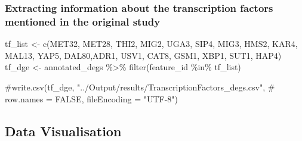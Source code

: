 \documentclass[
  letterpaper,
  DIV=11,
  numbers=noendperiod]{scrartcl}
\newenvironment{Shaded}{\begin{snugshade}}{\end{snugshade}}
\newcommand{\CommentTok}[1]{\textcolor[rgb]{0.37,0.37,0.37}{#1}}
\newcommand{\FunctionTok}[1]{\textcolor[rgb]{0.28,0.35,0.67}{#1}}
\newcommand{\NormalTok}[1]{\textcolor[rgb]{0.00,0.23,0.31}{#1}}
\newcommand{\OtherTok}[1]{\textcolor[rgb]{0.00,0.23,0.31}{#1}}
\newcommand{\SpecialCharTok}[1]{\textcolor[rgb]{0.37,0.37,0.37}{#1}}
\newcommand{\StringTok}[1]{\textcolor[rgb]{0.13,0.47,0.30}{#1}}
\begin{document}
\subsubsection{Extracting information about the transcription factors
mentioned in the original
study}\label{extracting-information-about-the-transcription-factors-mentioned-in-the-original-study}

\begin{Shaded}
\begin{Highlighting}[]
\NormalTok{tf\_list }\OtherTok{\textless{}{-}} \FunctionTok{c}\NormalTok{(}\StringTok{\textquotesingle{}MET32\textquotesingle{}}\NormalTok{, }\StringTok{\textquotesingle{}MET28\textquotesingle{}}\NormalTok{, }\StringTok{\textquotesingle{}THI2\textquotesingle{}}\NormalTok{, }\StringTok{\textquotesingle{}MIG2\textquotesingle{}}\NormalTok{, }\StringTok{\textquotesingle{}UGA3\textquotesingle{}}\NormalTok{, }\StringTok{\textquotesingle{}SIP4\textquotesingle{}}\NormalTok{, }
             \StringTok{\textquotesingle{}MIG3\textquotesingle{}}\NormalTok{, }\StringTok{\textquotesingle{}HMS2\textquotesingle{}}\NormalTok{, }\StringTok{\textquotesingle{}KAR4\textquotesingle{}}\NormalTok{, }\StringTok{\textquotesingle{}MAL13\textquotesingle{}}\NormalTok{, }\StringTok{\textquotesingle{}YAP5\textquotesingle{}}\NormalTok{, }\StringTok{\textquotesingle{}DAL80\textquotesingle{}}\NormalTok{,}\StringTok{\textquotesingle{}ADR1\textquotesingle{}}\NormalTok{, }
             \StringTok{\textquotesingle{}USV1\textquotesingle{}}\NormalTok{, }\StringTok{\textquotesingle{}CAT8\textquotesingle{}}\NormalTok{, }\StringTok{\textquotesingle{}GSM1\textquotesingle{}}\NormalTok{, }\StringTok{\textquotesingle{}XBP1\textquotesingle{}}\NormalTok{, }\StringTok{\textquotesingle{}SUT1\textquotesingle{}}\NormalTok{, }\StringTok{\textquotesingle{}HAP4\textquotesingle{}}\NormalTok{)}
\NormalTok{tf\_dge }\OtherTok{\textless{}{-}}\NormalTok{ annotated\_degs }\SpecialCharTok{\%\textgreater{}\%} \FunctionTok{filter}\NormalTok{(feature\_id }\SpecialCharTok{\%in\%}\NormalTok{ tf\_list)}

\CommentTok{\#write.csv(tf\_dge, "../Output/results/TranscriptionFactors\_degs.csv", }
\CommentTok{\#          row.names = FALSE, fileEncoding = "UTF{-}8")}
\end{Highlighting}
\end{Shaded}

\subsection{Data Visualisation}\label{data-visualisation}
\end{document}
